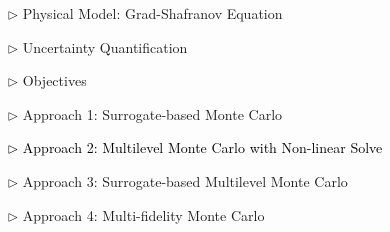\documentclass{beamer}
\begin{document}
\begin{frame}[c]
\large 	
\textcolor{mygray1}{
    \begin{itemize}[leftmargin=5pt] 
        \item[$\triangleright$]  Physical Model: Grad-Shafranov Equation
        \vspace{0.2cm}	
        \item[$\triangleright$] Uncertainty Quantification
        \vspace{0.2cm}
        \item[$\triangleright$]  Objectives
        \vspace{0.2cm}
        \item[$\triangleright$] Approach 1: Surrogate-based Monte Carlo
        \vspace{0.2cm}
        \item[\textcolor{black}{$\triangleright$}] \textcolor{black}{\fontsize{25}{60}\selectfont Approach 2: Multilevel Monte Carlo with Non-linear Solve}
        \vspace{0.2cm}
        \item[$\triangleright$] Approach 3: Surrogate-based Multilevel Monte Carlo
        \vspace{0.2cm}
        \item[$\triangleright$] Approach 4: Multi-fidelity Monte Carlo
    \end{itemize}
}
\end{frame}
\end{document}
